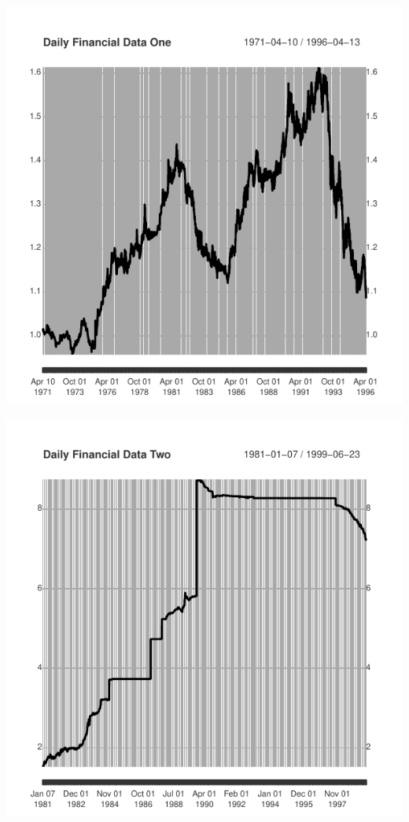 \documentclass{article}\usepackage[]{graphicx}\usepackage[]{color}
\makeatletter
\def\maxwidth{ %
  \ifdim\Gin@nat@width>\linewidth
    \linewidth
  \else
    \Gin@nat@width
  \fi
}
\newenvironment{knitrout}{}{} %
\theoremstyle{definition}
\makeatother
\begin{document}
\begin{knitrout}
\color{fgcolor}

{\centering \includegraphics[width=\maxwidth]{figure/get_dat-1} 

}




{\centering \includegraphics[width=\maxwidth]{figure/get_dat-2} 

}



\end{knitrout}
\end{document}
